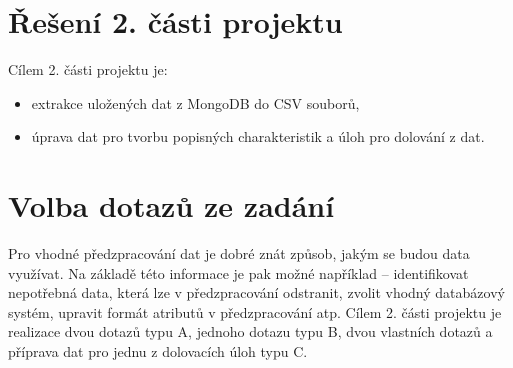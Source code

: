\documentclass[12pt]{article}
\begin{document}
\afterpage{\cfoot{\thepage }}

\section{Řešení 2. části projektu}
Cílem 2. části projektu je:
\begin{itemize}
    \item extrakce uložených dat z MongoDB do CSV souborů,
    \item úprava dat pro tvorbu popisných charakteristik a úloh pro dolování z dat.
\end{itemize}

\section{Volba dotazů ze zadání}
\label{dotazy}
Pro vhodné předzpracování dat je dobré znát způsob, jakým se budou data využívat. Na základě této informace je pak možné například -- identifikovat nepotřebná data, která lze v předzpracování odstranit, zvolit vhodný databázový systém, upravit formát atributů v předzpracování atp. Cílem 2. části projektu je realizace dvou dotazů typu A, jednoho dotazu typu B, dvou vlastních dotazů a příprava dat pro jednu z dolovacích úloh typu C.
\end{document}

